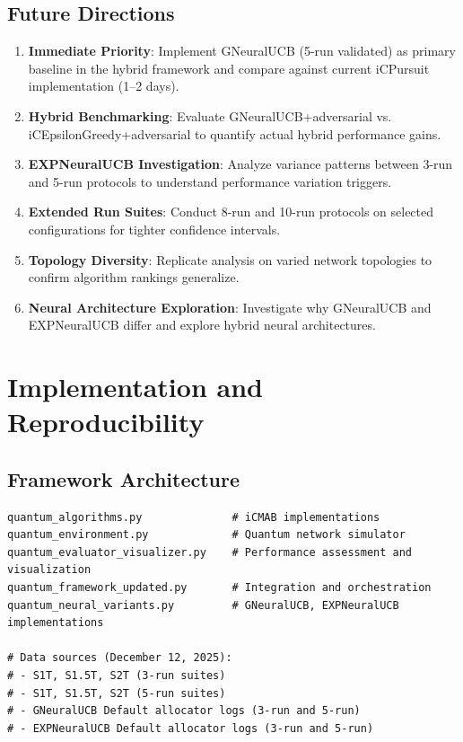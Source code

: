 \documentclass[12pt,a4paper]{article}
\begin{document}
\subsection{Future Directions}
\begin{enumerate}
\item \textbf{Immediate Priority}: Implement GNeuralUCB (5-run validated) as primary baseline in the hybrid framework and compare against current iCPursuit implementation (1--2 days).
\item \textbf{Hybrid Benchmarking}: Evaluate GNeuralUCB+adversarial vs. iCEpsilonGreedy+adversarial to quantify actual hybrid performance gains.
\item \textbf{EXPNeuralUCB Investigation}: Analyze variance patterns between 3-run and 5-run protocols to understand performance variation triggers.
\item \textbf{Extended Run Suites}: Conduct 8-run and 10-run protocols on selected configurations for tighter confidence intervals.
\item \textbf{Topology Diversity}: Replicate analysis on varied network topologies to confirm algorithm rankings generalize.
\item \textbf{Neural Architecture Exploration}: Investigate why GNeuralUCB and EXPNeuralUCB differ and explore hybrid neural architectures.
\end{enumerate}

\section{Implementation and Reproducibility}

\subsection{Framework Architecture}
\begin{lstlisting}[caption=Core iCMAB and Neural Framework Components]
quantum_algorithms.py              # iCMAB implementations
quantum_environment.py             # Quantum network simulator
quantum_evaluator_visualizer.py    # Performance assessment and visualization
quantum_framework_updated.py       # Integration and orchestration
quantum_neural_variants.py         # GNeuralUCB, EXPNeuralUCB implementations

# Data sources (December 12, 2025):
# - S1T, S1.5T, S2T (3-run suites)
# - S1T, S1.5T, S2T (5-run suites)
# - GNeuralUCB Default allocator logs (3-run and 5-run)
# - EXPNeuralUCB Default allocator logs (3-run and 5-run)
\end{lstlisting}
\end{document}
